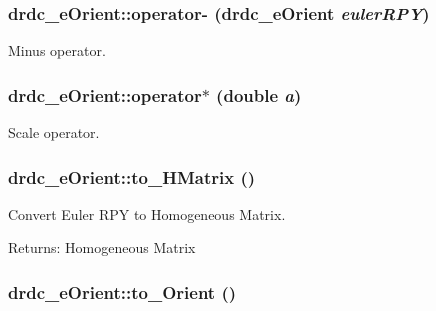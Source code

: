 \hypertarget{classdrdc__eOrient_ea687019fd89fc60dd6987df7eb79ba5}{
\subsubsection[operator-]{ drdc\_\-eOrient::operator- ({\bf drdc\_\-eOrient} {\em eulerRPY})}}
\label{classdrdc__eOrient_ea687019fd89fc60dd6987df7eb79ba5}


Minus operator. 

\hypertarget{classdrdc__eOrient_5a545bb7cc5415d5f6ada753353a4649}{
\subsubsection[operator$\ast$]{ drdc\_\-eOrient::operator$\ast$ (double {\em a})}}
\label{classdrdc__eOrient_5a545bb7cc5415d5f6ada753353a4649}


Scale operator. 

\hypertarget{classdrdc__eOrient_9e84a33ac930ed1b3b9d8a124025ffdd}{
\subsubsection[to\_\-HMatrix]{ drdc\_\-eOrient::to\_\-HMatrix ()}}
\label{classdrdc__eOrient_9e84a33ac930ed1b3b9d8a124025ffdd}


Convert Euler RPY to Homogeneous Matrix. 

\begin{Desc}
\item[Returns:]Homogeneous Matrix \end{Desc}
\hypertarget{classdrdc__eOrient_e7ece991434258af7eed20910a725759}{
\subsubsection[to\_\-Orient]{ drdc\_\-eOrient::to\_\-Orient ()}}
\label{classdrdc__eOrient_e7ece991434258af7eed20910a725759}


